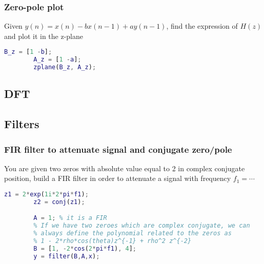     \subsubsection{Zero-pole plot}
    Given $y(n)=x(n)-bx(n-1)+ay(n-1)$, find the expression of $H(z)$ and plot it in the z-plane
    \begin{lstlisting}[language=Matlab, escapeinside=`']
        B_z = [1 -b];
        A_z = [1 -a];
        zplane(B_z, A_z);
    \end{lstlisting}

\pagebreak\subsection{DFT}

\pagebreak\subsection{Filters}

    \subsubsection{FIR filter to attenuate signal and conjugate zero/pole}
    You are given two zeros with absolute value equal to 2 in complex conjugate position, build a FIR filter in order to attenuate a signal with frequency $f_1=\cdots$
    \begin{lstlisting}[language=Matlab, escapeinside=`']
        z1 = 2*exp(1i*2*pi*f1);
        z2 = conj(z1);

        A = 1; % it is a FIR
        % If we have two zeroes which are complex conjugate, we can
        % always define the polynomial related to the zeros as
        % 1 - 2*rho*cos(theta)z^{-1} + rho^2 z^{-2}
        B = [1, -2*cos(2*pi*f1), 4];
        y = filter(B,A,x);
    \end{lstlisting}

